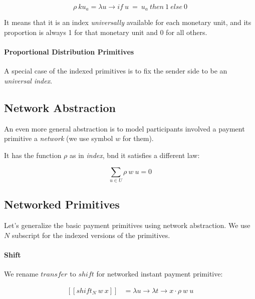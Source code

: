 \begin{equation}
    \rho\ ku_{a} = \lambda u \rightarrow if\ u\ =\ u_a\ then\ 1\ else\ 0
\end{equation}

It means that it is an index \textit{universally} available for each monetary unit, and its
proportion is always 1 for that monetary unit and 0 for all others.

\paragraph{Proportional Distribution Primitives}

A special case of the indexed primitives is to fix the sender side to be an \textit{universal
index}.

\subsection{Network Abstraction}

An even more general abstraction is to model participants involved a payment primitive
a \textit{network} (we use symbol $w$ for them).

It has the function $\rho$ as in \textit{index}, bnd it satisfies a different law:

\begin{equation}
    \displaystyle \sum_{u \in U} \rho\ w\ u = 0
\end{equation}

\subsection{Networked Primitives}

Let's generalize the basic payment primitives using network abstraction. We use $N$ subscript for
the indexed versions of the primitives.

\paragraph{Shift}

We rename $transfer$ to $shift$ for networked instant payment primitive:

\begin{equation}
    \begin{split}
        [\![shift_N\ w\ x]\!] &=
        \lambda u \rightarrow \lambda t \rightarrow x \cdot \rho\ w\ u
    \end{split}
\end{equation}

